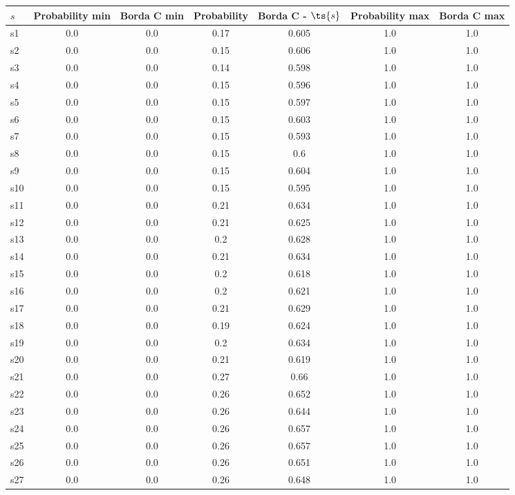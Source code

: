 \documentclass{article}
\begin{document}
\noindent\begin{tabular}{|l|c|c|c|c|c|c|}
\hline
$s$& Probability min & Borda C min & Probability & Borda C - $\ts{s}$ & Probability max & Borda C max\\
\hline
s1 &0.0 & 0.0 & 0.17 & 0.605 & 1.0 & 1.0\\
\hline
s2 &0.0 & 0.0 & 0.15 & 0.606 & 1.0 & 1.0\\
\hline
s3 &0.0 & 0.0 & 0.14 & 0.598 & 1.0 & 1.0\\
\hline
s4 &0.0 & 0.0 & 0.15 & 0.596 & 1.0 & 1.0\\
\hline
s5 &0.0 & 0.0 & 0.15 & 0.597 & 1.0 & 1.0\\
\hline
s6 &0.0 & 0.0 & 0.15 & 0.603 & 1.0 & 1.0\\
\hline
s7 &0.0 & 0.0 & 0.15 & 0.593 & 1.0 & 1.0\\
\hline
s8 &0.0 & 0.0 & 0.15 & 0.6 & 1.0 & 1.0\\
\hline
s9 &0.0 & 0.0 & 0.15 & 0.604 & 1.0 & 1.0\\
\hline
s10 &0.0 & 0.0 & 0.15 & 0.595 & 1.0 & 1.0\\
\hline
s11 &0.0 & 0.0 & 0.21 & 0.634 & 1.0 & 1.0\\
\hline
s12 &0.0 & 0.0 & 0.21 & 0.625 & 1.0 & 1.0\\
\hline
s13 &0.0 & 0.0 & 0.2 & 0.628 & 1.0 & 1.0\\
\hline
s14 &0.0 & 0.0 & 0.21 & 0.634 & 1.0 & 1.0\\
\hline
s15 &0.0 & 0.0 & 0.2 & 0.618 & 1.0 & 1.0\\
\hline
s16 &0.0 & 0.0 & 0.2 & 0.621 & 1.0 & 1.0\\
\hline
s17 &0.0 & 0.0 & 0.21 & 0.629 & 1.0 & 1.0\\
\hline
s18 &0.0 & 0.0 & 0.19 & 0.624 & 1.0 & 1.0\\
\hline
s19 &0.0 & 0.0 & 0.2 & 0.634 & 1.0 & 1.0\\
\hline
s20 &0.0 & 0.0 & 0.21 & 0.619 & 1.0 & 1.0\\
\hline
s21 &0.0 & 0.0 & 0.27 & 0.66 & 1.0 & 1.0\\
\hline
s22 &0.0 & 0.0 & 0.26 & 0.652 & 1.0 & 1.0\\
\hline
s23 &0.0 & 0.0 & 0.26 & 0.644 & 1.0 & 1.0\\
\hline
s24 &0.0 & 0.0 & 0.26 & 0.657 & 1.0 & 1.0\\
\hline
s25 &0.0 & 0.0 & 0.26 & 0.657 & 1.0 & 1.0\\
\hline
s26 &0.0 & 0.0 & 0.26 & 0.651 & 1.0 & 1.0\\
\hline
s27 &0.0 & 0.0 & 0.26 & 0.648 & 1.0 & 1.0\\

\end{tabular}
\end{document}
